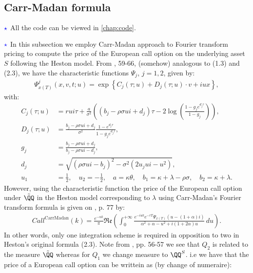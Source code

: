 \documentclass[12pt]{article}
\numberwithin{equation}{section}
\newcommand{\lc}{\left\{}
\newcommand{\rc}{\right\}}
\begin{document}
\subsection{Carr-Madan formula}
$\textcolor{blue}{\star}$ All the code can be viewed in \autoref{chap:code}.

$\textcolor{blue}{\star}$ In this subsection we employ Carr-Madan approach to
Fourier transform pricing
to compute the price of the European call option on the underlying asset $S$
following the Heston model. From \cite{Havrylenko2024}, 59-66, (somehow) analogous to
(1.3) and (2.3), we have the characteristic functions $\Psi_j$, $j=1,2$, given by:
\begin{align*}
    \Psi_{x(T)}^j(x,v,t;u)=\exp \lc C_j (\tau; u) + D_j (\tau; u) \cdot v + i  u x \rc,
\end{align*}
with:
\begin{align*}
    C_j(\tau ; u) &= rui\tau + \frac{a}{\sigma^2}\left( (b_j - \rho\sigma ui + d_j) \tau - 2 \log \left( \frac{1 - g_j e^{d_j \tau}}{1 - g_j} \right) \right), \\
    D_j(\tau ; u) &= \frac{b_j - \rho \sigma ui + d_j}{\sigma^2} \frac{1 - e^{d_j \tau}}{1 - g_j e^{d_j \tau}}, \\
    g_j &= \frac{b_j - \rho\sigma ui + d_j}{b_j - \rho\sigma ui - d_j}, \\
    d_j &= \sqrt{(\rho\sigma ui - b_j)^2 - \sigma^2(2u_jui - u^2)},\\
    u_1 &= \frac{1}{2}, \quad u_2 = -\frac{1}{2}, \quad a = \kappa\theta, \quad b_1 = \kappa + \lambda - \rho\sigma, \quad b_2 = \kappa + \lambda.
\end{align*}
However, using the characteristic function the price of the European call option under
$\tilde{\QQ}$ in the Heston model corresponding to $\lambda$ using Carr-Madan's
Fourier transform formula is
given on \cite{Havrylenko2024}, p. 77 by:
\begin{align*}
    Call^{\text{CarrMadan}}(k) = \frac{e^{-\alpha k}}{\pi} \mathfrak{Re} \left( \int_{0}^{+\infty} \frac{e^{-iu k} e^{-rT} \Psi_{x(T)}\left(u - (1 + \alpha)i\right)}{\alpha^{2} + \alpha - u^{2} + i(1 + 2\alpha)u} \, du \right).
\end{align*}
In other words, only one integration scheme is required in opposition to two in
Heston's original formula (2.3). Note from \cite{Havrylenko2024}, pp. 56-57 we
see that $Q_2$ is related to the measure $\tilde{\QQ}$ whereas for $Q_1$ we change
measure to $\QQ^S$. i.e we have that the price of a European call option can be
writtein as (by change of numeraire):
\end{document}
